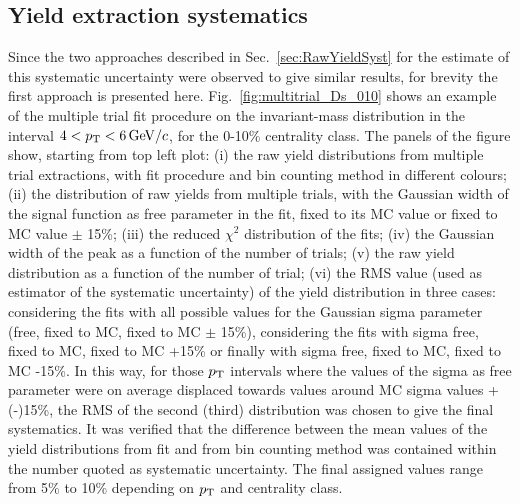 \subsection{Yield extraction systematics}
\label{sec:YieldExsystAA}
Since the two approaches described in 
Sec.~\ref{sec:RawYieldSyst} for the estimate of this 
systematic uncertainty were observed to give similar results,
for brevity the first approach is presented here. Fig.~\ref{fig:multitrial_Ds_010}
shows an example of the multiple trial fit procedure on the invariant-mass
distribution in the interval $4 < p_{\rm T} < 6 \, \mathrm{GeV}/c$, for the 0-10\% centrality class.
The panels of the figure show, starting from top left plot:
(i) the raw yield distributions from multiple trial extractions, 
with fit procedure and bin counting method 
in different colours; (ii) the distribution of raw yields from multiple 
trials, with the Gaussian width of the signal function as free parameter 
in the fit, fixed to its MC value or fixed to MC value $\pm$ 15\%; 
(iii) the reduced $\chi^{2}$ distribution of the fits; 
(iv) the Gaussian width of the peak as a function of the 
number of trials; (v) the raw yield distribution as a 
function of the number of trial; (vi) the RMS value (used as
estimator of the systematic uncertainty) of the yield distribution
in three cases: considering the fits with 
all possible values for the Gaussian sigma parameter (free, fixed to MC, fixed to MC $\pm$ 15\%), 
considering the fits with sigma free, fixed to MC, fixed to 
MC +15\% or finally with sigma free, fixed to MC, fixed to MC -15\%. 
In this way, for those $p_{\rm T}$ intervals where the values 
of the sigma as free parameter were on average displaced towards 
values around MC sigma values +(-)15\%, the RMS of the second (third) 
distribution was chosen to give the final systematics. 
It was verified that the difference between the mean values of the yield distributions from fit
and from bin counting method was contained within the number quoted 
as systematic uncertainty.
The final assigned values range from 5\% to 10\% depending on $p_{\rm T}$ and
centrality class. 



